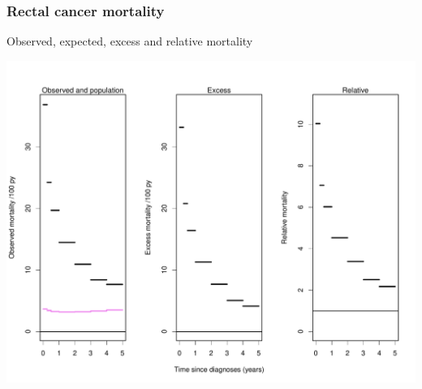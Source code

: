 \documentclass[handout,12pt,dvipsnames,t]{beamer}
\begin{document}
\begin{frame}[fragile]
   \frametitle{Rectal cancer mortality}

Observed, expected, excess and relative mortality

{\footnotesize
\includegraphics{Survival_competing_risk-em3}
}

\end{frame}
\end{document}
